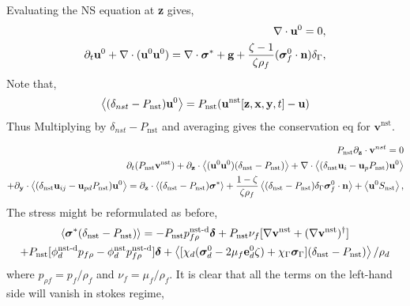 Evaluating the NS equation at \textbf{z} gives, 
\begin{align}
    \mathbf{\nabla}\cdot \textbf{u}^0 = 0, \\
    \partial_t \textbf{u}^0
    + \mathbf{\nabla}\cdot (\textbf{u}^0\textbf{u}^0 )
    = 
    \mathbf{\nabla}\cdot \bm\sigma^*
    + \textbf{g}
    +\frac{\zeta-1}{\zeta\rho_f}(\bm\sigma_f^0\cdot \textbf{n})\delta_\Gamma,
\end{align}
Note that, 
\begin{equation}
    \left<(\delta_{nst} - P_\text{nst}) \textbf{u}^0\right>
    = P_\text{nst}(\textbf{u}^\text{nst}[\textbf{z},\textbf{x},\textbf{y},t] - \textbf{u})
\end{equation}
Thus Multiplying by $\delta_{nst} - P_\text{nst}$ and averaging gives the conservation eq for $\textbf{v}^\text{nst}$. 


\begin{align}
    P_\text{nst} {\partial_\textbf{z}} \cdot \textbf{v}^{nst}
    = 0 
    \\
    \partial_t (P_\text{nst} \textbf{v}^\text{nst})
    + {\partial_\textbf{z}} \cdot\left<(\textbf{u}^0 \textbf{u}^0 )(\delta_\text{nst} - P_\text{nst})\right> 
    + \mathbf{\nabla}\cdot \left<(\delta_\text{nst} \textbf{u}_i  - \textbf{u}_p P_\text{nst})\textbf{u}^0 \right> \nonumber \\ 
    + {\partial_\textbf{y}}\cdot\left<(\delta_\text{nst} \textbf{u}_{ij}  - \textbf{u}_{pd} P_\text{nst})\textbf{u}^0 \right>
    =  
    {\partial_\textbf{z}}\cdot\left<(\delta_\text{nst} - P_\text{nst}) \bm\sigma^*\right>
    + \frac{1 - \zeta}{\zeta\rho_f}\left< (\delta_\text{nst} - P_\text{nst}) \delta_\Gamma \bm\sigma_f^0\cdot \textbf{n}\right>
    + \left<\textbf{u}^0 S_\text{nst}\right>,
\end{align}
The stress might be reformulated as before, 
\begin{multline}
    \left<\bm\sigma^* (\delta_\text{nst} - P_\text{nst})\right> 
    = 
    - P_\text{nst}  p_{f\rho}^\text{nst-d}\bm\delta
    + P_\text{nst} \nu_f [\mathbf{\nabla} \textbf{v}^\text{nst}+(\mathbf{\nabla} \textbf{v}^\text{nst})^\dagger] \\
    +P_\text{nst} [\phi_d^\text{nst-d} p_{f\rho}
    - \phi_d^\text{nst} p_{f\rho}^\text{nst-d}] \bm\delta
    + \left<[\chi_d (\bm\sigma_d^0 - 2 \mu_f \textbf{e}^0_d \zeta) + \chi_\Gamma \bm\sigma_\Gamma ]  (\delta_\text{nst} - P_\text{nst})\right> /\rho_d \nonumber
\end{multline}
where $p_{\rho f} = p_f/ \rho_f$ and $\nu_f = \mu_f/\rho_f$. 
It is clear that all the terms on the left-hand side will vanish in stokes regime,


